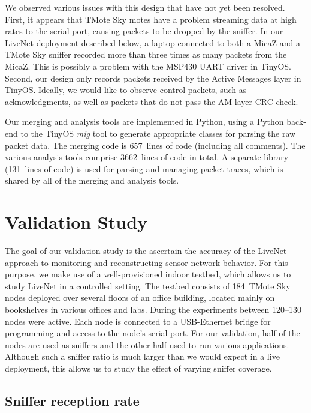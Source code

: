 We observed various issues with this design that have not yet been
resolved. First, it appears that TMote Sky motes have a problem
streaming data at high rates to the serial port, causing packets to
be dropped by the sniffer. In our LiveNet deployment described below, 
a laptop connected to both a MicaZ and a TMote Sky sniffer 
recorded more than three times as many
packets from the MicaZ. This is possibly a problem with the MSP430
UART driver in TinyOS. Second, our design only records packets
received by the Active Messages layer in TinyOS. Ideally, we would
like to observe control packets, such as acknowledgments, as well as
packets that do not pass the AM layer CRC check. 


Our merging and analysis tools are implemented in Python, using a
Python back-end to the TinyOS {\em mig} tool to generate appropriate
classes for parsing the raw packet data. The merging code is 
657~lines of code (including all comments). The various analysis
tools comprise 3662~lines of code in total. A separate library 
(131~lines of code) is used for parsing and managing packet traces,
which is shared by all of the merging and analysis tools.



\section{Validation Study}
\label{sec-livenet-validation}

The goal of our validation study is the ascertain the accuracy of the
LiveNet approach to monitoring and reconstructing sensor network
behavior. For this purpose, we make use of a well-provisioned indoor
testbed, which allows us to study LiveNet in a controlled setting.
The testbed consists of 184~TMote Sky nodes
deployed over several floors of an office building, located mainly on
bookshelves in various offices and labs. During the experiments
between 120--130 nodes were active. Each node is connected to a
USB-Ethernet bridge for programming and access to the node's serial
port. For our validation, half of the nodes are used as sniffers and the
other half used to run various applications. Although such a sniffer
ratio is much larger than we would expect in a live deployment,
this allows us to study the effect of varying sniffer coverage.

\subsection{Sniffer reception rate}

